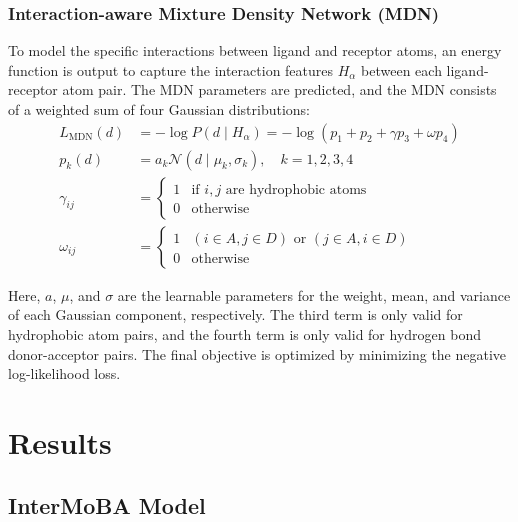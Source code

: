 \documentclass[11pt,a4paper]{article}
\begin{document}
\subsubsection{Interaction-aware Mixture Density Network (MDN)}
To model the specific interactions between ligand and receptor atoms, an
energy function is output to capture the
interaction features $H_{\alpha}$ between each ligand-receptor atom
pair. The MDN parameters\cite{bishop1994mixture} are predicted, and the MDN consists of a
weighted sum of four Gaussian distributions:
\begin{equation}
\begin{aligned}
L_{\text{MDN}}(d) &= -\log P\left( d \mid H_{\alpha} \right) = -\log\left( p_{1} + p_{2} + \gamma p_{3} + \omega p_{4} \right) \\
p_{k}(d) &= a_{k} \mathcal{N} \left( d \mid \mu_{k}, \sigma_{k} \right), \quad k = 1,2,3,4 \\
\gamma_{ij} &= 
\begin{cases} 
1 & \text{if } i,j \text{ are hydrophobic atoms} \\
0 & \text{otherwise}
\end{cases} \\
\omega_{ij} &= 
\begin{cases} 
1 & (i \in A, j \in D) \text{ or } (j \in A, i \in D) \\
0 & \text{otherwise}
\end{cases}
\end{aligned}
\end{equation}

Here, $a$, $\mu$, and $\sigma$ are the learnable parameters for the
weight, mean, and variance of each Gaussian component, respectively. The
third term is only valid for hydrophobic atom pairs, and the fourth term
is only valid for hydrogen bond donor-acceptor pairs. The final
objective is optimized by minimizing the negative log-likelihood loss.

\section{Results}

\subsection{InterMoBA Model}
\end{document}
